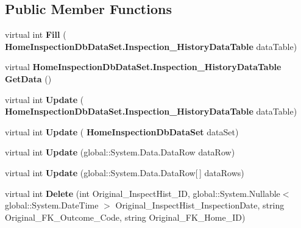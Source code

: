 \subsection*{Public Member Functions}
\begin{DoxyCompactItemize}
\item 
\mbox{\label{class_a_f_h___scheduler_1_1_home_inspection_db_data_set_table_adapters_1_1_inspection___history_table_adapter_ae164a14326a06fc6a74505bdb33f74b2}} 
virtual int {\bfseries Fill} (\textbf{ Home\+Inspection\+Db\+Data\+Set.\+Inspection\+\_\+\+History\+Data\+Table} data\+Table)
\item 
\mbox{\label{class_a_f_h___scheduler_1_1_home_inspection_db_data_set_table_adapters_1_1_inspection___history_table_adapter_aa6af6e6d8440353951d8242d397f0be6}} 
virtual \textbf{ Home\+Inspection\+Db\+Data\+Set.\+Inspection\+\_\+\+History\+Data\+Table} {\bfseries Get\+Data} ()
\item 
\mbox{\label{class_a_f_h___scheduler_1_1_home_inspection_db_data_set_table_adapters_1_1_inspection___history_table_adapter_a51d7439b959271c66c1eeb3b549fce0c}} 
virtual int {\bfseries Update} (\textbf{ Home\+Inspection\+Db\+Data\+Set.\+Inspection\+\_\+\+History\+Data\+Table} data\+Table)
\item 
\mbox{\label{class_a_f_h___scheduler_1_1_home_inspection_db_data_set_table_adapters_1_1_inspection___history_table_adapter_a9b3f45b2b92acad07c1f2084c26cc87f}} 
virtual int {\bfseries Update} (\textbf{ Home\+Inspection\+Db\+Data\+Set} data\+Set)
\item 
\mbox{\label{class_a_f_h___scheduler_1_1_home_inspection_db_data_set_table_adapters_1_1_inspection___history_table_adapter_ad164c616f041a8fb58f955c21a7410de}} 
virtual int {\bfseries Update} (global\+::\+System.\+Data.\+Data\+Row data\+Row)
\item 
\mbox{\label{class_a_f_h___scheduler_1_1_home_inspection_db_data_set_table_adapters_1_1_inspection___history_table_adapter_a9017ce96a13ea21346a1039f7ffb7b0a}} 
virtual int {\bfseries Update} (global\+::\+System.\+Data.\+Data\+Row[$\,$] data\+Rows)
\item 
\mbox{\label{class_a_f_h___scheduler_1_1_home_inspection_db_data_set_table_adapters_1_1_inspection___history_table_adapter_a784b8728226f2e643f8e82dc1f0173fa}} 
virtual int {\bfseries Delete} (int Original\+\_\+\+Inspect\+Hist\+\_\+\+ID, global\+::\+System.\+Nullable$<$ global\+::\+System.\+Date\+Time $>$ Original\+\_\+\+Inspect\+Hist\+\_\+\+Inspection\+Date, string Original\+\_\+\+F\+K\+\_\+\+Outcome\+\_\+\+Code, string Original\+\_\+\+F\+K\+\_\+\+Home\+\_\+\+ID)

\end{DoxyCompactItemize}
